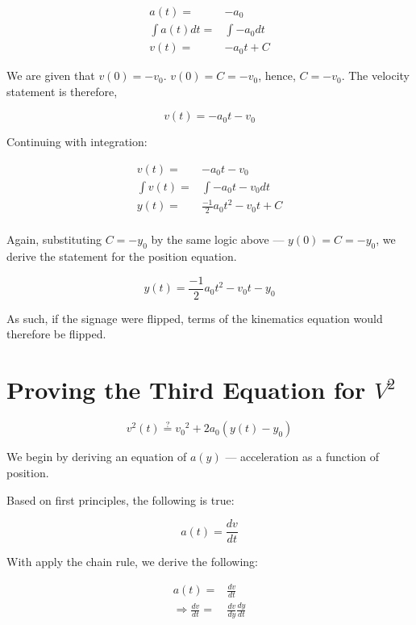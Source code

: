 \documentclass[letterpaper]{article}
\begin{document}
\begin{align}
    a(t) =& -a_0 \\
    \int a(t) dt =& \int -a_0 dt \\
    v(t) =& -a_0t + C 
\end{align}

We are given that \(v(0)=-v_0\). \(v(0) = C = -v_0\), hence, \(C=-v_0\). The velocity statement is therefore,

\begin{equation}
    v(t) = -a_0t-v_0
\end{equation}

Continuing with integration:

\begin{align}
    v(t) =& -a_0t - v_0 \\
    \int v(t) =& \int -a_0t - v_0 dt \\
    y(t) =& \frac{-1}{2}a_0t^2 - v_0t+C \\
\end{align}

Again, substituting \(C = -y_0\) by the same logic above --- \(y(0) = C = -y_0\), we derive the statement for the position equation.

\begin{equation}
    y(t) = \frac{-1}{2}a_0t^2 - v_0t - y_0
\end{equation}

As such, if the signage were flipped, terms of the kinematics equation would therefore be flipped.

\section{Proving the Third Equation for \(V^2\)}
\label{sec:orge9e861b}
\begin{equation}
    v^2(t) \stackrel{?}{=} {v_0}^2 + 2a_0(y(t)-y_0)
\end{equation}

We begin by deriving an equation of \(a(y)\) --- acceleration as a function of position.

Based on first principles, the following is true:

\begin{equation}
    a(t) = \frac{dv}{dt}
\end{equation}

With apply the chain rule, we derive the following:

\begin{align}
    a(t) =& \frac{dv}{dt} \\
    \Rightarrow \frac{dv}{dt} =& \frac{dv}{dy}\frac{dy}{dt} \\
\end{align}
\end{document}
